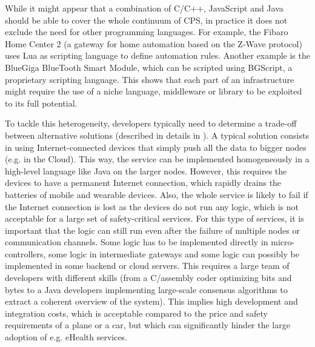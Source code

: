 While it might appear that a combination of C/C++, JavaScript and Java should be able to cover the whole continuum of CPS, in practice it does not exclude the need for other programming languages. For example, the Fibaro Home Center 2 (a gateway for home automation based on the Z-Wave protocol) uses Lua as scripting language to define automation rules. Another example is the BlueGiga BlueTooth Smart Module, which can be scripted using BGScript, a proprietary scripting language. This shows that each part of an infrastructure might require the use of a niche language, middleware or library to be exploited to its full potential. 

To tackle this heterogeneity, developers typically need to determine a trade-off between alternative solutions (described in details in \cite{DBLP:conf/icse/MorinFB15}). A typical solution consists in using Internet-connected devices that simply push all the data to bigger nodes (e.g. in the Cloud). This way, the service can be implemented homogeneously in a high-level language like Java on the larger nodes. However, this requires the devices to have a permanent Internet connection, which rapidly drains the batteries of mobile and wearable devices. Also, the whole service is likely to fail if the Internet connection is lost as the devices do not run any logic, which is not acceptable for a large set of safety-critical services. For this type of services, it is important that the logic can still run even after the failure of multiple nodes or communication channels. Some logic has to be implemented directly in micro-controllers, some logic in intermediate gateways and some logic can possibly be implemented in some backend or cloud servers. This requires a large team of developers with different skills (from a C/assembly coder optimizing bits and bytes to a Java developers implementing large-scale consensus algorithms to extract a coherent overview of the system). This implies high development and integration costs, which is acceptable compared to the price and safety requirements of a plane or a car, but which can significantly hinder the large adoption of e.g. eHealth services. 